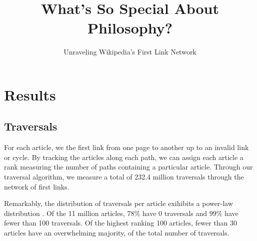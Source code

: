 \documentclass[twoside]{article}
\title{\vspace{-5mm}%
	\fontsize{24pt}{12pt}\selectfont
	\textbf{What's So Special About Philosophy?} 
	}
\author{%
\fontsize{14pt}{14pt}\selectfont
	Unraveling Wikipedia's First Link Network \vspace{-2mm}\\
	}
\date{}
\newcommand{\red}[1]{{\leavevmode\color{sred}{#1}}} %
\begin{document}
\maketitle
\thispagestyle{fancy}

\begin{abstract}
\fontsize{12pt}{12pt}
\selectfont
%
%
%
\red{rewrite abstract}

\end{abstract}

\fontsize{11pt}{11pt}
\selectfont
\section{Results}


\subsection{Traversals}

For each article, we the first link from one page to another up to an invalid link or cycle. By tracking the articles along each path, we can assign each article a rank measuring the number of paths containing a particular article. Through our traversal algorithm, we measure a total of 232.4 million 
traversals through the network of first links. 


Remarkably, the distribution of traversals per article exihibits a power-law distribution \red{((citation + justification)) for justification look at definition of power-law; consider log-log with line}. Of the 11 million articles, $78\%$ have 0 traversals and $99\%$ have fewer than 100 traversals. Of the highest ranking 100 articles, fewer than $30$ articles have an overwhelming majority, \red{((~7 million, confirm))} of the total number of traversals.
\end{document}
